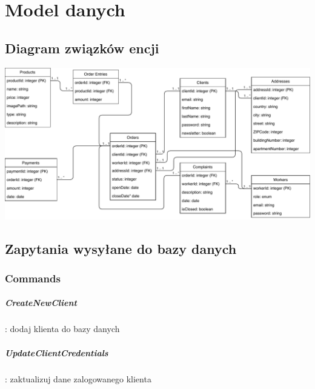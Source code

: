 \documentclass[12pt]{report}
\begin{document}
	
	

	\renewcommand{\thesection}{\thechapter.\arabic{section}}		
	
\chapter{Model danych}
	
	\section{Diagram związków encji}
		\includegraphics[width=500pt]{database.pdf}
		\newpage
		
	\section{Zapytania wysyłane do bazy danych}
	
		\subsection{Commands}
		
				\paragraph{CreateNewClient} : dodaj klienta do bazy danych 
				
				\paragraph{UpdateClientCredentials} : zaktualizuj dane zalogowanego klienta
				
\end{document}
